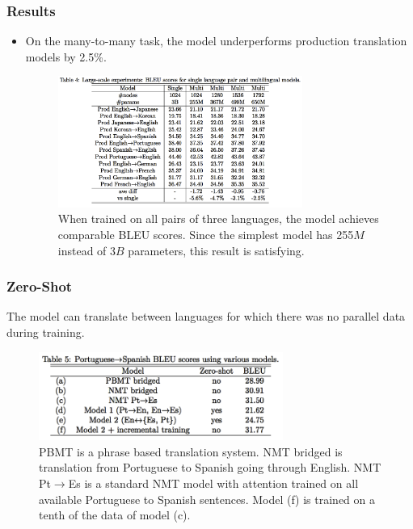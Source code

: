 \documentclass{beamer}
\begin{document}
\begin{frame}
\frametitle{Results}
\begin{itemize}
\item On the many-to-many task, the model underperforms production translation models by 2.5\%.
 \begin{figure}
  \centering
  \includegraphics[width=8cm]{pres_imgs/manyto-many}
  \caption{\label{fig:manyto-many} When trained on all pairs of three languages, the model achieves comparable BLEU scores. Since the simplest model has 255$M$ instead of 3$B$ parameters, this result is satisfying.}
\end{figure}

\end{itemize}

\end{frame}

\begin{frame}
\frametitle{Zero-Shot}
The model can translate between languages for which there was no parallel data during training.
 \begin{figure}
  \centering
  \includegraphics[width=8cm]{pres_imgs/zeroshottab}
  \caption{\label{fig:zeroshottab} PBMT is a phrase based translation system. NMT bridged is translation from Portuguese to Spanish going through English. NMT Pt$\rightarrow$Es is a standard NMT model with attention trained on all available Portuguese to Spanish sentences. Model (f) is trained on a tenth of the data of model (c).}
\end{figure}
\end{frame}
\end{document}
